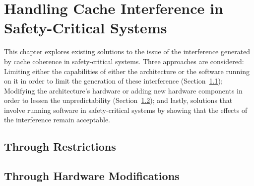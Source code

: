 \chapter{Handling Cache Interference in Safety-Critical Systems}
\label{cha:handling_it}
This chapter explores existing solutions to the issue of the interference
generated by cache coherence in safety-critical systems. Three approaches are
considered: Limiting either the capabilities of either the architecture or the
software running on it in order to limit the generation of these interference
(Section~\ref{sec:rel_work:handling_it:through_restrictions}); Modifying the
architecture's hardware or adding new hardware components in order to lessen
the unpredictability (Section~\ref{sec:rel_work:handling_it:through_hardware});
and lastly, solutions that involve running software in safety-critical systems
by showing that the effects of the interference remain acceptable.

\section{Through Restrictions}
\label{sec:rel_work:handling_it:through_restrictions}






\section{Through Hardware Modifications}
\label{sec:rel_work:handling_it:through_hardware}





